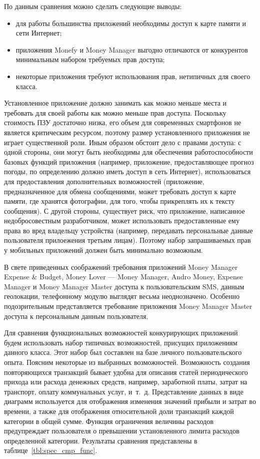\vspace{-2.5mm}

По данным сравнения можно сделать следующие выводы:
\begin{itemize}
\item для работы большинства приложений необходимы доступ
  к карте памяти и сети Интернет;
\item приложения Monefy и Money Manager выгодно отличаются от конкурентов
  минимальным набором требуемых прав доступа;
\item некоторые приложения требуют использования прав,
  нетипичных для своего класса.
\end{itemize}

Установленное приложение должно занимать как можно меньше места
и требовать для своей работы как можно меньше прав доступа.
Поскольку стоимость ПЗУ достаточно низка, его объем для современных смартфонов
не является критическим ресурсом, поэтому размер установленного приложения не играет
существенной роли.
Иным образом обстоит дело с правами доступа:
с одной стороны, они могут быть необходимы для обеспечения работоспособности
базовых функций приложения (например, приложение, предоставляющее прогноз погоды,
по определению должно иметь доступ в сеть Интернет),
использоваться для предоставления дополнительных
возможностей (приложение, предназначенное для обмена сообщениями,
может требовать доступ к карте памяти, где хранятся фотографии, для того, чтобы
прикреплять их к тексту сообщения).
С другой стороны, существует риск, что приложение, написанное недобросовестным
разработчиком, может использовать предоставленные ему права
во вред владельцу устройства
(например, передавать персональные данные пользователя прилоежения третьим лицам).
Поэтому набор запрашиваемых прав у мобильных приложений должен быть
минимально возможным.

В свете приведенных соображений требования приложений
Money Manager Expense \& Budget, Money Lover --- Money Manager,
Andro Money, Expense Manager и Money Manager Master доступа
к пользовательским SMS, данным геолокации,
телефонному модулю выглядят весьма неоднозначено.
Особенно подозрительным представляется требование приложения
Money Manager Master доступа к персональным данным пользователя.

Для сравнения функциональных возможностей конкурирующих приложений
будем использовать набор типичных возможностей,
присущих приложениям данного класса.
Этот набор был составлен на базе личного пользовательского опыта.
Поясним некоторые из выбранных возможностей.
Возможность создания повторяющихся транзакций бывает удобна для
описания статей периодического прихода или расхода денежных средств, например,
заработной платы, затрат на транспорт, оплату коммунальных услуг, и~т.~д.
Представление данных в виде диаграмм используется
для отображения изменения значений прибыли и затрат во времени,
а также для отображения относительной доли транзакций
каждой категории в общей сумме.
Функция ограничения величины расходов предупреждает пользователя
о превышении установленного лимита расходов определенной категории.
Результаты сравнения представлены в таблице~\ref{tbl:spec_cmp_func}.

